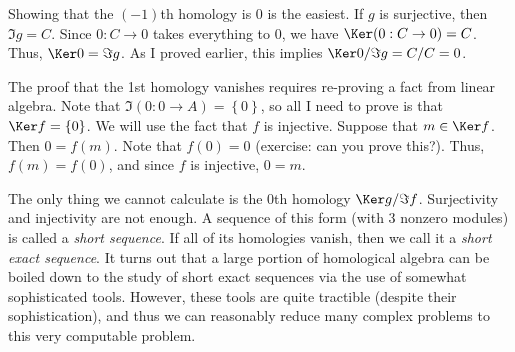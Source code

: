 Showing that the $(-1)$th homology is 0 is the easiest. If $g$ is surjective, then $\Im g = C$. Since $0: C \to 0$ takes everything to 0, we have $\Ker (0 : C \to 0) = C$. Thus, $\Ker 0 = \Im g$. As I proved earlier, this implies $\Ker 0 / \Im g = C / C = 0$.

The proof that the 1st homology vanishes requires re-proving a fact from linear algebra. Note that $\Im(0: 0 \to A) = \left\{ 0 \right\} $, so all I need to prove is that $\Ker f = \left\{ 0 \right\} $. We will use the fact that $f$ is injective. Suppose that $m\in \Ker f$. Then $0=f(m)$. Note that $f(0)=0$ (exercise: can you prove this?). Thus, $f(m)=f(0)$, and since $f$ is injective, $0=m$.

The only thing we cannot calculate is the 0th homology $\Ker g / \Im f$. Surjectivity and injectivity are not enough. A sequence of this form (with 3 nonzero modules) is called a \emph{short sequence}. If all of its homologies vanish, then we call it a \emph{short exact sequence}. It turns out that a large portion of homological algebra can be boiled down to the study of short exact sequences via the use of somewhat sophisticated tools. However, these tools are quite tractible (despite their sophistication), and thus we can reasonably reduce many complex problems to this very computable problem.
